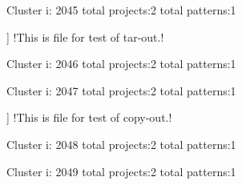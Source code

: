 Cluster i: 2045
total projects:2
total patterns:1
\begin{multicols}{1}
\begin{description}[noitemsep,topsep=0pt]
\item [[2] ] \cverb!This is file for test of tar-out.!
\end{description}
\end{multicols}







Cluster i: 2046
total projects:2
total patterns:1
\begin{multicols}{1}
\begin{description}[noitemsep,topsep=0pt]
\item [[2] ] \cverb![^/\\,{]\*\*|\*\*[^/\\,}]!
\end{description}
\end{multicols}







Cluster i: 2047
total projects:2
total patterns:1
\begin{multicols}{1}
\begin{description}[noitemsep,topsep=0pt]
\item [[2] ] \cverb!This is file for test of copy-out.!
\end{description}
\end{multicols}







Cluster i: 2048
total projects:2
total patterns:1
\begin{multicols}{1}
\end{multicols}







Cluster i: 2049
total projects:2
total patterns:1
\begin{multicols}{1}
\end{multicols}







